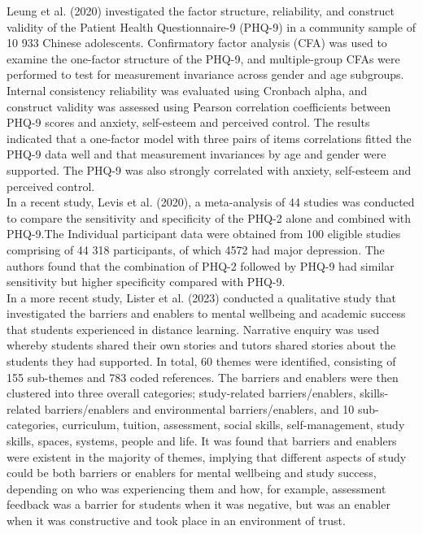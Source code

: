 \documentclass{article}
\numberwithin{equation}{section}
\begin{document}
	\noindent Leung et al. (2020) investigated the factor structure, reliability, and construct validity of the Patient Health Questionnaire-9 (PHQ-9) in a community sample of 10 933 Chinese adolescents. Confirmatory factor analysis (CFA) was used to examine the one-factor structure of the PHQ-9, and multiple-group CFAs were performed to test for measurement invariance across gender and age subgroups. Internal consistency reliability was evaluated using Cronbach alpha, and construct validity was assessed using Pearson correlation coefficients between PHQ-9 scores and anxiety, self-esteem and perceived control. The results indicated that a one-factor model with three pairs of items correlations fitted the PHQ-9 data well and that measurement invariances by age and gender were supported. The PHQ-9 was also strongly correlated with anxiety, self-esteem and perceived control.\\
	
	\noindent In a recent study, Levis et al. (2020), a meta-analysis of 44 studies was conducted to compare the sensitivity and specificity of the PHQ-2 alone and combined with PHQ-9.The Individual participant data were obtained from 100 eligible studies comprising of 44 318 participants, of which 4572 had major depression. The authors found that the combination of PHQ-2 followed by PHQ-9 had similar sensitivity but higher specificity compared with PHQ-9.\\
	
	\noindent In a more recent study, Lister et al. (2023) conducted a qualitative study that investigated the barriers and enablers to mental wellbeing and academic success that students experienced in distance learning. Narrative enquiry was used whereby students shared their own stories and tutors shared stories about the students they had supported. In total, 60 themes were identified, consisting of 155 sub-themes and 783 coded references. The barriers and enablers were then clustered into three overall categories; study-related barriers/enablers, skills-related barriers/enablers and environmental barriers/enablers, and 10 sub-categories, curriculum, tuition, assessment, social skills, self-management, study skills, spaces, systems, people and life. It was found that barriers and enablers were existent in the majority of themes, implying that different aspects of study could be both barriers or enablers for mental wellbeing and study success, depending on who was experiencing them and how, for example, assessment feedback was a barrier for students when it was negative, but was an enabler when it was constructive and took place in an environment of trust.\\
	
\end{document}
